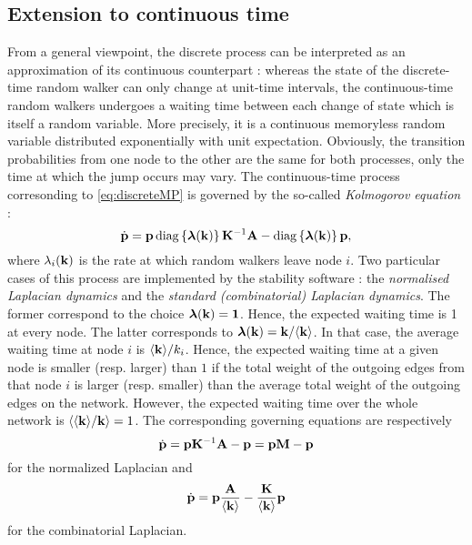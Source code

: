 \subsection{Extension to continuous time}
From a general viewpoint, the discrete process can be interpreted as an approximation of its continuous counterpart : whereas the state of the discrete-time random walker can only change at unit-time intervals, the continuous-time random walkers undergoes a waiting time between each change of state which is itself a random variable. More precisely, it is a continuous memoryless random variable distributed exponentially with unit expectation. Obviously, the transition probabilities from one node to the other are the same for both processes, only the time at which the jump occurs may vary. The continuous-time process corresonding to \eqref{eq:discreteMP} is governed by the so-called \textit{Kolmogorov equation} :
\begin{equation} \label{eq:continuousMP_general}
    	\dot{\mathbf p} = \mathbf p \operatorname{diag}\left\{\boldsymbol \lambda(\mathbf k)\right\} \mathbf K^{-1} \mathbf A - \operatorname{diag}\left\{\boldsymbol \lambda(\mathbf k)\right\} \mathbf p,
\end{equation}
where $\lambda_i(\mathbf k)$ is the rate at which random walkers leave node $i$. Two particular cases of this process are implemented by the stability software : the \textit{normalised Laplacian dynamics} and the \textit{standard (combinatorial) Laplacian dynamics}. The former correspond to the choice $\boldsymbol \lambda(\mathbf k) = \mathbf 1$. Hence, the expected waiting time is 1 at every node. The latter corresponds to $\boldsymbol \lambda(\mathbf k) = \mathbf k/\langle \mathbf k \rangle$. In that case, the average waiting time at node $i$ is $\langle \mathbf k \rangle/k_i$. Hence, the expected waiting time at a given node is smaller (resp. larger) than $1$ if the total weight of the outgoing edges from that node $i$ is larger (resp. smaller) than the average total weight of the outgoing edges on the network. However, the expected waiting time over the whole network is $\langle \langle \mathbf k \rangle/\mathbf k \rangle = 1$. The corresponding governing equations are respectively 
\begin{equation} \label{eq:continuousMP_norm}
	\dot{\mathbf p} = \mathbf p \mathbf K^{-1} \mathbf A - \mathbf p = \mathbf p \mathbf M - \mathbf p
\end{equation}
for the normalized Laplacian and
\begin{equation} \label{eq:continuousMP_combi}
    	\dot{\mathbf p} = \mathbf p \frac{\mathbf A}{\langle \mathbf k \rangle} - \frac{\mathbf K}{\langle \mathbf k \rangle} \mathbf p
\end{equation}
for the combinatorial Laplacian.

